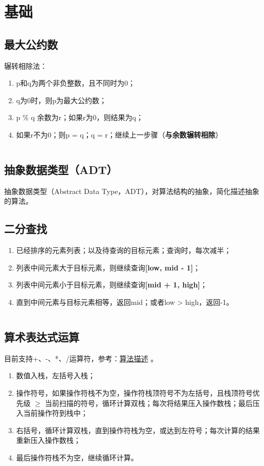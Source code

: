 \documentclass{article}
\begin{document}
\section{基础}
  \subsection{最大公约数}
  辗转相除法：
  \begin{enumerate}
    \item p和q为两个非负整数，且不同时为0；
    \item q为0时，则p为最大公约数；
    \item p \% q 余数为r；如果r为0，则结果为q；
    \item 如果r不为0；则p = q；q = r；继续上一步骤（\textbf{与余数辗转相除}）
  \end{enumerate}

  \inputminted{java}{src/chapter01/GCD.java}

  \subsection{抽象数据类型（ADT）}
  抽象数据类型（Abstract Data Type，ADT），对算法结构的抽象，简化描述抽象的算法。

  \subsection{二分查找}
  \begin{enumerate}
    \item 已经排序的元素列表；以及待查询的目标元素；查询时，每次减半；
    \item 列表中间元素大于目标元素，则继续查询\textbf{[low, mid - 1]}；
    \item 列表中间元素小于目标元素，则继续查询\textbf{[mid + 1, high]}；
    \item 直到中间元素与目标元素相等，返回mid；或者low > high，返回-1。
  \end{enumerate}

  \inputminted{java}{src/chapter01/BinarySearch.java}

  \subsection{算术表达式运算}
  目前支持+、-、*、/运算符，参考：\href{http://faculty.cs.niu.edu/~hutchins/csci241/eval.htm}{算法描述} 。
  \begin{enumerate}
    \item 数值入栈，左括号入栈；
    \item 操作符号，如果操作符栈不为空，操作符栈顶符号不为左括号，且栈顶符号优先级 $\geq$ 当前扫描的符号，循环计算双栈；每次将结果压入操作数栈；最后压入当前操作符到栈中；
    \item 右括号，循环计算双栈，直到操作符栈为空，或达到左符号；每次计算的结果重新压入操作数栈；
    \item 最后操作符栈不为空，继续循环计算。
  \end{enumerate}
\end{document}
